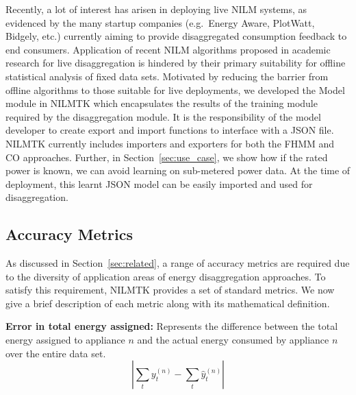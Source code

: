 \documentclass{sig-alternate}
\newcommand{\redcolor}[1]{\textcolor{red}{#1}}
\newcommand{\secref}[1]{Section~\ref{#1}}
\begin{document}

\noindent
Recently, a lot of interest has arisen in deploying live NILM systems, as evidenced by the many startup companies (e.g.\ Energy Aware, PlotWatt, Bidgely, etc.) currently aiming to provide disaggregated consumption feedback to end consumers. Application of recent NILM algorithms proposed in academic research for live disaggregation is hindered by their primary suitability for offline statistical analysis of fixed data sets. Motivated by reducing the barrier from offline algorithms to those suitable for live deployments, we developed the Model module in NILMTK which encapsulates the results of the training module required by the disaggregation module. It is the responsibility of the model developer to create export and import functions to interface with a JSON file. NILMTK currently includes importers and exporters for both the FHMM and CO approaches. Further, in \secref{sec:use_case}, we show how if the rated power is known, we can avoid learning on sub-metered power data. At the time of deployment, this learnt JSON model can be easily imported and used for disaggregation.

\subsection{Accuracy Metrics}

\noindent
As discussed in \secref{sec:related}, a range of accuracy metrics are required due to the diversity of application areas of energy disaggregation approaches. To satisfy this requirement, NILMTK provides a set of standard metrics. 
We now give a brief description of each metric along with its mathematical definition.

\textbf{Error in total energy assigned:} Represents the difference between the total energy assigned to appliance $n$ and the actual energy consumed by appliance $n$ over the entire data set.
\begin{equation}
        \left | \sum_t y^{(n)}_t - \sum_t \hat{y}^{(n)}_t \right |
\end{equation}
\end{document}
